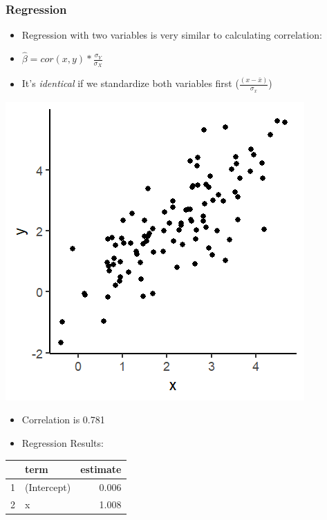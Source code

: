\documentclass[xcolor=x11names,compress]{beamer}\usepackage[]{graphicx}\usepackage[]{color}
\makeatletter
\def\maxwidth{ %
  \ifdim\Gin@nat@width>\linewidth
    \linewidth
  \else
    \Gin@nat@width
  \fi
}
\newenvironment{knitrout}{}{} %
\renewcommand{\(}{\begin{columns}}
\renewcommand{\)}{\end{columns}}
\newcommand{\<}[1]{\begin{column}{#1}}
\renewcommand{\>}{\end{column}}
\makeatother
\begin{document}
\begin{frame}
\frametitle{Regression}
\begin{itemize}
\item Regression with two variables is very similar to calculating correlation:
\item $\hat{\beta}=cor(x,y) * \frac{\sigma_Y}{\sigma_X}$
\item It's \textit{identical} if we standardize both variables first ($\frac{(x-\bar{x})}{\sigma_x}$)
\end{itemize}
\begin{multicols}{2}
\begin{knitrout}
\color{fgcolor}
\includegraphics[width=\maxwidth]{figure/corr_regn_fig2-1} 

\end{knitrout}
\columnbreak
\begin{itemize}
\item Correlation is 0.781
\pause
\item Regression Results:
\end{itemize}
\begin{table}[ht]
\centering
\begin{tabular}{rlr}
  \hline
 & term & estimate \\ 
  \hline
1 & (Intercept) & 0.006 \\ 
  2 & x & 1.008 \\ 
   \hline
\end{tabular}
\end{table}

\end{multicols}
\end{frame}
\end{document}
